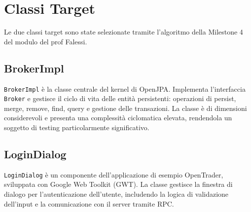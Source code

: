 \section{Classi Target}

Le due classi target sono state selezionate tramite l'algoritmo della
Milestone 4 del modulo del prof Falessi.

\subsection{BrokerImpl}

\texttt{BrokerImpl} è la classe centrale del kernel di OpenJPA.
Implementa l'interfaccia \texttt{Broker} e gestisce il ciclo di vita
delle entità persistenti: operazioni di persist, merge, remove, find,
query e gestione delle transazioni.
La classe è di dimensioni considerevoli e presenta una complessità
ciclomatica elevata, rendendola un soggetto di testing particolarmente
significativo.

\subsection{LoginDialog}

\texttt{LoginDialog} è un componente dell'applicazione di esempio
OpenTrader, sviluppata con Google Web Toolkit (GWT).
La classe gestisce la finestra di dialogo per l'autenticazione
dell'utente, includendo la logica di validazione dell'input e la
comunicazione con il server tramite RPC.
